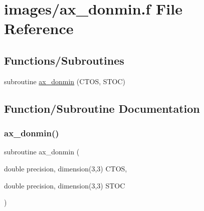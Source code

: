 \hypertarget{ax__donmin_8f}{}\section{images/ax\+\_\+donmin.f File Reference}
\label{ax__donmin_8f}
\subsection*{Functions/\+Subroutines}
\begin{DoxyCompactItemize}
\item 
subroutine \hyperlink{ax__donmin_8f_abf586a2de1b6cdf70c12ec62a2f81bf4}{ax\+\_\+donmin} (C\+T\+OS, S\+T\+OC)
\end{DoxyCompactItemize}


\subsection{Function/\+Subroutine Documentation}
\mbox{\label{ax__donmin_8f_abf586a2de1b6cdf70c12ec62a2f81bf4}} 
\subsubsection{\texorpdfstring{ax\+\_\+donmin()}{ax\_donmin()}}
{\footnotesize\ttfamily subroutine ax\+\_\+donmin (\begin{DoxyParamCaption}\item[{double precision, dimension(3,3)}]{C\+T\+OS,  }\item[{double precision, dimension(3,3)}]{S\+T\+OC }\end{DoxyParamCaption})}

